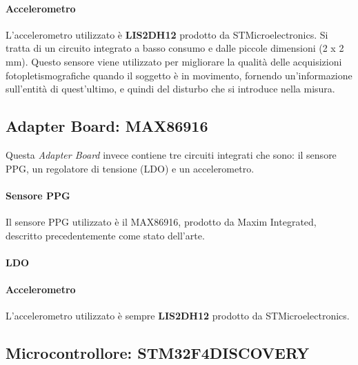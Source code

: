 \paragraph{Accelerometro} L'accelerometro utilizzato è \textbf{LIS2DH12} prodotto da STMicroelectronics. Si tratta di un circuito integrato a basso consumo e dalle piccole dimensioni (2 x 2 mm). Questo sensore viene utilizzato per migliorare la qualità delle acquisizioni fotopletismografiche quando il soggetto è in movimento, fornendo un'informazione sull'entità di quest'ultimo, e quindi del disturbo che si introduce nella misura. 

\subsection{Adapter Board: MAX86916}
Questa \textit{Adapter Board} invece contiene tre circuiti integrati che sono: il sensore PPG, un regolatore di tensione (LDO) e un accelerometro.

\paragraph{Sensore PPG} Il sensore PPG utilizzato è il MAX86916, prodotto da Maxim Integrated, descritto precedentemente come stato dell'arte.

\paragraph{LDO} 

\paragraph{Accelerometro} L'accelerometro utilizzato è sempre \textbf{LIS2DH12} prodotto da STMicroelectronics.

\subsection{Microcontrollore: STM32F4DISCOVERY}
